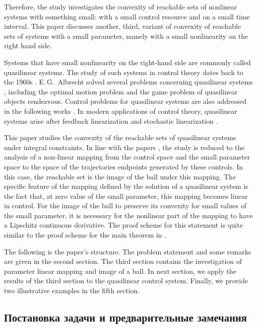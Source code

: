 \documentclass[../main.tex]{subfiles}
\begin{document}
Therefore, the study investigates the convexity of reachable sets of nonlinear systems with something small: with a small control resource and on a small time interval. This paper discusses another, third, variant of convexity of reachable sets of systems with a small parameter, namely with a small nonlinearity on the right hand side.

Systems that have small nonlinearity on the right-hand side are commonly called quasilinear systems.
The study of such systems in control theory dates back to the 1960s \cite{Subbotin, Kiselev, Kras}.
E.\,G.~Albrecht solved several problems concerning quasilinear systems \cite{Albrecht3}, including the optimal motion problem \cite{Albrecht1} and the game problem of quasilinear objects rendezvous\cite{Albrecht2}.
Control problems for quasilinear systems are also addressed in the following works \cite{Dauer, Kremlev, KalininLavrinovich2018, Gabasov}.
In modern applications of control theory, quasilinear systems arise after feedback linearization \cite{Calvet} and
stochastic linearization \cite{Ching, Gui}.

This paper studies the convexity of the reachable sets of quasilinear systems under integral constraints. 
In line with the papers \cite{Polyak2001, Polyak2004, GusOsSteklov, GusevUMJ, Osipov, GusOsUdmurt}, the study is reduced to the analysis of a non-linear mapping from the  control space and the small parameter space to the space of the trajectories endpoints generated by these controls.
In this case, the reachable set is the image of the ball under this mapping. 
The specific feature of the mapping defined by the solution of a quasilinear system is the fact that, at zero value of the small parameter, this mapping becomes linear in control.
For the image of the ball to preserve its convexity for small values of the small parameter, it is necessary for the nonlinear part of the mapping to have a Lipschitz  continuous derivative. 
The proof scheme for this statement is quite similar to the proof scheme for the main theorem in \cite{Polyak2001}.

The following is the paper's structure. The problem statement and some remarks are given in the second section. The third section contains the investigation of parameter linear mapping and image of a ball. In next section, we apply the results of the third section to the quasilinear control system. Finally, we provide two illustrative examples in the fifth section.

\subsection{Постановка задачи и предварительные замечания}
\end{document}
